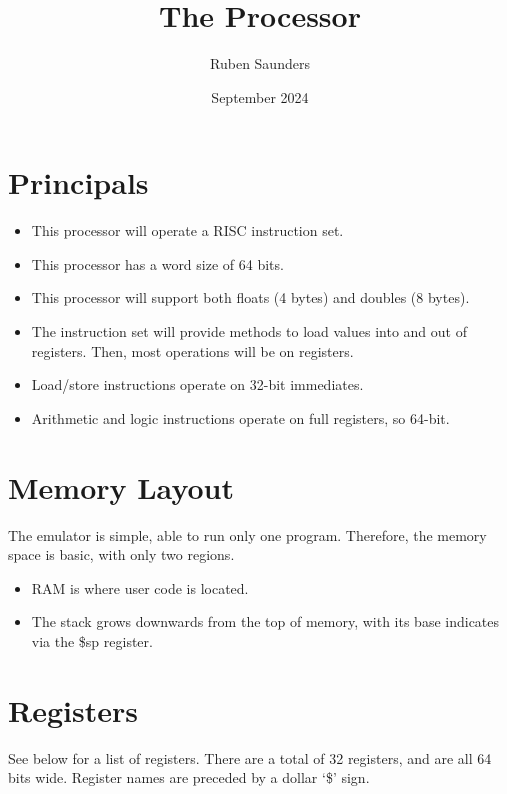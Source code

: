 \documentclass[10pt]{article}
\title{The Processor}
\author{Ruben Saunders}
\date{September 2024}
\begin{document}
    \maketitle
    \tableofcontents

    \newpage

    \section{Principals}\label{sec:principals}

    \begin{itemize}
        \item This processor will operate a RISC instruction set.
        \item This processor has a word size of 64 bits.
        \item This processor will support both floats (4 bytes) and doubles (8 bytes).
        \item The instruction set will provide methods to load values into and out of registers.
        Then, most operations will be on registers.
        \item Load/store instructions operate on 32-bit immediates.
        \item Arithmetic and logic instructions operate on full registers, so 64-bit.
    \end{itemize}

    \section{Memory Layout}\label{sec:memory-layout}

    The emulator is simple, able to run only one program.
    Therefore, the memory space is basic, with only two regions.
    \begin{itemize}
        \item RAM is where user code is located.
        \item The stack grows downwards from the top of memory, with its base indicates via the \$sp register.
    \end{itemize}

    \section{Registers}\label{sec:registers}

    See below for a list of registers.
    There are a total of 32 registers, and are all 64 bits wide.
    Register names are preceded by a dollar `\$' sign.
\end{document}
